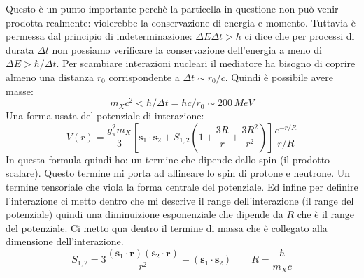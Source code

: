Questo è un punto importante perchè la particella in questione non può venir prodotta realmente: violerebbe la conservazione di energia e momento. Tuttavia è permessa dal principio di indeterminazione: $\Delta E\Delta t>\hbar$ ci dice che per processi di durata $\Delta t$ non possiamo verificare la conservazione dell'energia a meno di $\Delta E>\hbar/\Delta t$. Per scambiare interazioni nucleari il mediatore ha bisogno di coprire almeno una distanza $r_0$ corrispondente a $\Delta t\sim r_0/c$. Quindi è possibile avere masse:
\begin{equation*}
    m_Xc^2<\hbar/\Delta t=\hbar c/r_0\sim200\,MeV
\end{equation*}
Una forma usata del potenziale di interazione:
\begin{equation*}
V(r)=\frac{g_\pi^2m_X}{3}\left[\mathbf{s}_1\cdot\mathbf{s}_2+S_{1,2}\left(1+\frac{3R}{r}+\frac{3R^2}{r^2}\right)\right]\frac{e^{-r/R}}{r/R}
\end{equation*}
In questa formula quindi ho: un termine che dipende dallo spin (il prodotto scalare). Questo termine mi porta ad allineare lo spin di protone e neutrone. Un termine tensoriale che viola la forma centrale del potenziale. Ed infine per definire l'interazione ci metto dentro che mi descrive il range dell'interazione (il range del potenziale) quindi una diminuizione esponenziale che dipende da $R$ che è il range del potenziale. Ci metto qua dentro il termine di massa che è collegato alla dimensione dell'interazione.
\begin{equation*}
    S_{1,2}=3\frac{(\mathbf{s}_1\cdot\mathbf{r})(\mathbf{s}_2\cdot\mathbf{r})}{r^2}-(\mathbf{s}_1\cdot\mathbf{s}_2)\qquad R=\frac{\hbar}{m_Xc}
\end{equation*}